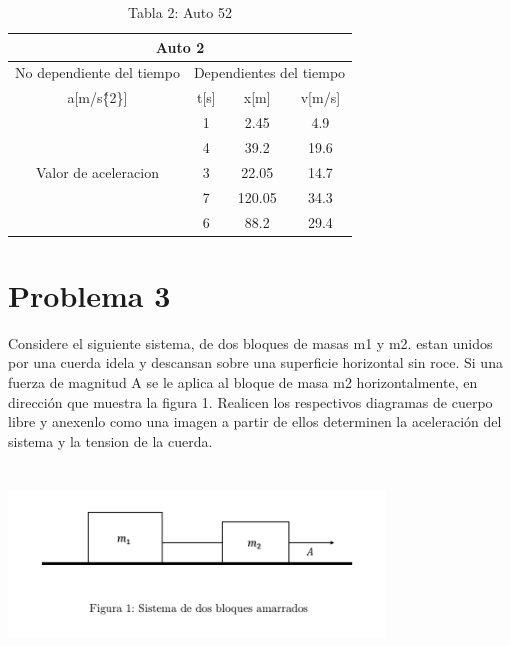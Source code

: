 \documentclass[a4paper, 12pt]{article}
\begin{document}
\begin{table}
\caption{Tabla 2: Auto 52}
    \label{Tabla.1}
\centering
\begin{tabular}{|c|c|c|c|} 
\hline
\multicolumn{4}{|c|}{Auto 2}                                                          \\ 
\hline
No dependiente del tiempo             & \multicolumn{3}{l|}{Dependientes del tiempo}  \\ 
\hline
a[m/s\^\{2\}]                         & t[s] & x[m]  & v[m/s]                         \\ 
\hline
\multirow{7}{*}{Valor de aceleracion} & 1    & 2.45  & 4.9                            \\ 
        
\cline{2-4}
                                      & 4    & 39.2    & 19.6                             \\ 
\cline{2-4}
                                      & 3    & 22.05 & 14.7                           \\ 
\cline{2-4}
                                      & 7    & 120.05 & 34.3                           \\ 
\cline{2-4}
                                      & 6    & 88.2   & 29.4                             \\
\hline
\end{tabular}
\end{table}
   
\section{Problema 3}
Considere el siguiente sistema, de dos bloques de masas m1 y m2. estan unidos por una cuerda idela y descansan sobre una superficie horizontal sin roce. Si una fuerza de magnitud A se le aplica al bloque de masa m2 horizontalmente, en dirección que muestra la figura 1. Realicen los respectivos diagramas de cuerpo libre y anexenlo como una imagen a partir de ellos determinen la aceleración del sistema y la tension de la cuerda.\\
\includegraphics[width=10cm, height=6cm]{diagrama 1.png}
\end{document}
